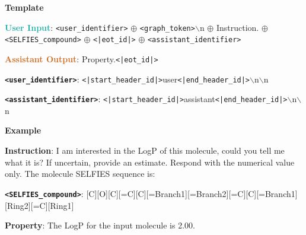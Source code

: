 \begin{tcolorbox}
[colback=white!98!black,colframe=white!30!black,boxsep=1.1pt,top=6.75pt]%
\vspace{1.75pt}%
\scriptsize
\noindent\makebox[\textwidth]{\rule{\textwidth}{1pt}}
\textbf{Template}
\\[-0.575em]
\noindent\makebox[\textwidth]{\rule{\textwidth}{1pt}}

\textbf{\textcolor[HTML]{20B2AA}{User Input}}: {\tt <user\_identifier>} $\oplus$ {\tt <graph\_token>}$\backslash$n $\oplus$ Instruction. $\oplus$ {\tt <SELFIES\_compound>} $\oplus$ {\tt <|eot\_id|>} $\oplus$ {\tt <assistant\_identifier>}

\textbf{\textcolor[HTML]{D2691E}{Assistant Output}}: Property.{\tt <|eot\_id|>}

{\tt \textbf{<user\_identifier>}}: {\tt <|start\_header\_id|>}user{\tt <|end\_header\_id|>}$\backslash$n$\backslash$n

{\tt \textbf{<assistant\_identifier>}}: {\tt <|start\_header\_id|>}assistant{\tt <|end\_header\_id|>}$\backslash$n$\backslash$n

\noindent\makebox[\textwidth]{\rule{\textwidth}{1pt}}
\textbf{Example}
\\[-0.575em]
\noindent\makebox[\textwidth]{\rule{\textwidth}{1pt}}

\begin{tcolorbox}[colback=cyan!7!white,colframe=white!98!black,boxsep=1.1pt,top=6.75pt]

\textbf{Instruction}: I am interested in the LogP of this molecule, could you tell me what it is? If uncertain, provide an estimate. Respond with the numerical value only. The molecule SELFIES sequence is:

{\tt \textbf{<SELFIES\_compound>}}: [C][O][C][=C][C][=Branch1][=Branch2][=C][C][=Branch1][Ring2][=C][Ring1]\-[=Branch1][O][C@H1][C@H1][C@@H1] [Branch1][Branch1][C][O][Ring1][Branch1][C@@H1][Branch1]\-[=Branch1][O][C][Ring1][\#Branch1][=O][C][=C][C][=Branch1][=C][=C][Branch1] [=Branch2][C][=Branch1]\-[Ring2][=C][Ring1][=Branch1][O][C][O][C][O]

\end{tcolorbox}

\begin{tcolorbox}[colback=orange!7!white,colframe=white!98!black,boxsep=1.1pt,top=6.75pt]
\textbf{Property}: The LogP for the input molecule is 2.00.
\end{tcolorbox}

\end{tcolorbox}

